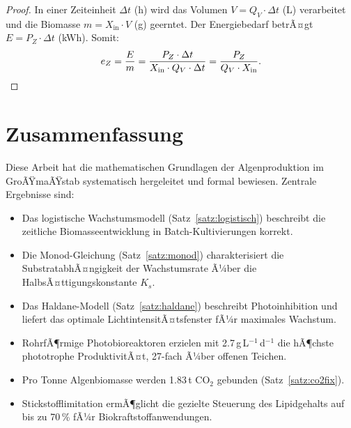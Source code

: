 ﻿\documentclass[a4paper,12pt]{article}
\theoremstyle{definition}
\begin{document}
\begin{proof}
	In einer Zeiteinheit $\Delta t$ (h) wird das Volumen $V = Q_V \cdot \Delta t$ (L)
	verarbeitet und die Biomasse $m = X_\mathrm{in} \cdot V$ (g) geerntet.
	Der Energiebedarf betrÃ¤gt $E = P_Z \cdot \Delta t$ (kWh).
	Somit:
	\[
		e_Z = \frac{E}{m} = \frac{P_Z \cdot \Delta t}{X_\mathrm{in} \cdot Q_V \cdot \Delta t}
		= \frac{P_Z}{Q_V \cdot X_\mathrm{in}}. \qedhere
	\]
\end{proof}

\section{Zusammenfassung}

Diese Arbeit hat die mathematischen Grundlagen der Algenproduktion im GroÃŸmaÃŸstab
systematisch hergeleitet und formal bewiesen. Zentrale Ergebnisse sind:

\begin{itemize}
	\item Das logistische Wachstumsmodell (Satz~\ref{satz:logistisch}) beschreibt
	      die zeitliche Biomasseentwicklung in Batch-Kultivierungen korrekt.
	\item Die Monod-Gleichung (Satz~\ref{satz:monod}) charakterisiert die
	      SubstratabhÃ¤ngigkeit der Wachstumsrate Ã¼ber die HalbsÃ¤ttigungskonstante $K_s$.
	\item Das Haldane-Modell (Satz~\ref{satz:haldane}) beschreibt Photoinhibition und
	      liefert das optimale LichtintensitÃ¤tsfenster fÃ¼r maximales Wachstum.
	\item RohrfÃ¶rmige Photobioreaktoren erzielen mit 2.7\,g\,L$^{-1}$\,d$^{-1}$
	      die hÃ¶chste phototrophe ProduktivitÃ¤t, 27-fach Ã¼ber offenen Teichen.
	\item Pro Tonne Algenbiomasse werden 1.83\,t CO$_2$ gebunden
	      (Satz~\ref{satz:co2fix}).
	\item Stickstofflimitation ermÃ¶glicht die gezielte Steuerung des
	      Lipidgehalts auf bis zu 70\,\% fÃ¼r Biokraftstoffanwendungen.
\end{itemize}
\end{document}
